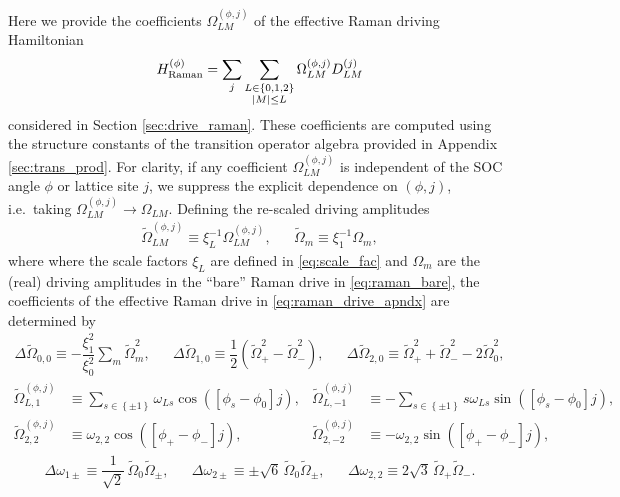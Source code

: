 \documentclass[nofootinbib,notitlepage,11pt]{revtex4-2}
\renewcommand{\t}{\text} %
\newcommand{\f}[2]{\dfrac{#1}{#2}} %
\newcommand{\p}[1]{\left(#1\right)} %
\renewcommand{\sp}[1]{\left[#1\right]} %
\renewcommand{\set}[1]{\left\{#1\right\}} %
\newcommand{\1}{\mathds{1}}
\begin{document}
Here we provide the coefficients $\Omega_{LM}^{(\phi,j)}$ of the
effective Raman driving Hamiltonian
\begin{align}
  H_{\t{Raman}}^{(\phi)}
  = \sum_j \sum_{\substack{L\in\set{0,1,2}\\\abs{M}\le L}}
  \Omega_{LM}^{(\phi,j)} D_{LM}^{(j)}
  \label{eq:raman_drive_apndx}
\end{align}
considered in Section \ref{sec:drive_raman}.  These coefficients are
computed using the structure constants of the transition operator
algebra provided in Appendix \ref{sec:trans_prod}.  For clarity, if
any coefficient $\Omega_{LM}^{(\phi,j)}$ is independent of the SOC
angle $\phi$ or lattice site $j$, we suppress the explicit dependence
on $\p{\phi,j}$, i.e.~taking $\Omega_{LM}^{(\phi,j)}\to\Omega_{LM}$.
Defining the re-scaled driving amplitudes
\begin{align}
  \tilde\Omega_{LM}^{(\phi,j)} \equiv \xi_L^{-1} \Omega_{LM}^{(\phi,j)},
  &&
  \tilde\Omega_m \equiv \xi_1^{-1} \Omega_m,
\end{align}
where where the scale factors $\xi_L$ are defined in
\eqref{eq:scale_fac} and $\Omega_m$ are the (real) driving amplitudes
in the ``bare'' Raman drive in \eqref{eq:raman_bare}, the coefficients
of the effective Raman drive in \eqref{eq:raman_drive_apndx} are
determined by
\begin{align}
  \Delta \tilde\Omega_{0,0}
  \equiv -\f{\xi_1^2}{\xi_0^2} \sum_m \tilde\Omega_m^2,
  &&
  \Delta \tilde\Omega_{1,0}
  \equiv \f12 \p{\tilde\Omega_+^2 - \tilde\Omega_-^2},
  &&
  \Delta \tilde\Omega_{2,0}
  \equiv \tilde\Omega_+^2 + \tilde\Omega_-^2 - 2\tilde\Omega_0^2,
  \label{eq:O_X0}
\end{align}
\begin{align}
  \tilde\Omega_{L,1}^{(\phi,j)}
  &\equiv \sum_{s\in\set{\pm1}}
  \omega_{Ls} \cos\p{\sp{\phi_s-\phi_0}j},
  &
  \tilde\Omega_{L,-1}^{(\phi,j)}
  &\equiv -\sum_{s\in\set{\pm1}}
  s \omega_{Ls} \sin\p{\sp{\phi_s-\phi_0}j}, \\
  \tilde\Omega_{2,2}^{(\phi,j)}
  &\equiv \omega_{2,2} \cos\p{\sp{\phi_+-\phi_-}j},
  &
  \tilde\Omega_{2,-2}^{(\phi,j)}
  &\equiv -\omega_{2,2} \sin\p{\sp{\phi_+-\phi_-}j},
\end{align}
\begin{align}
  \Delta \omega_{1\pm}
  \equiv \f1{\sqrt{2}} \, \tilde\Omega_0 \tilde\Omega_\pm,
  &&
  \Delta \omega_{2\pm}
  \equiv \pm \sqrt{6} \, \tilde\Omega_0\tilde\Omega_\pm,
  &&
  \Delta \omega_{2,2}
  \equiv 2\sqrt{3} \, \tilde\Omega_+\tilde\Omega_-.
\end{align}
\end{document}

